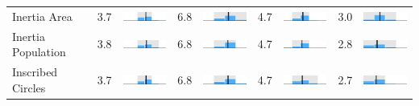 \begin{table}
\begin{tabular}{l rm{7em} rm{7em} rm{7em} rm{7em}}
Inertia Area           &   3.7 &    \includegraphics[width=7em]{mini_hist/WI_2004_inertia_a} &   6.8 &    \includegraphics[width=7em]{mini_hist/WI_2008_inertia_a} &   4.7 &    \includegraphics[width=7em]{mini_hist/WI_2012_inertia_a} &   3.0 &    \includegraphics[width=7em]{mini_hist/WI_2016_inertia_a} \\
Inertia Population     &   3.8 &    \includegraphics[width=7em]{mini_hist/WI_2004_inertia_p} &   6.8 &    \includegraphics[width=7em]{mini_hist/WI_2008_inertia_p} &   4.7 &    \includegraphics[width=7em]{mini_hist/WI_2012_inertia_p} &   2.8 &    \includegraphics[width=7em]{mini_hist/WI_2016_inertia_p} \\
Inscribed Circles      &   3.7 &    \includegraphics[width=7em]{mini_hist/WI_2004_ehrenburg} &   6.8 &    \includegraphics[width=7em]{mini_hist/WI_2008_ehrenburg} &   4.7 &    \includegraphics[width=7em]{mini_hist/WI_2012_ehrenburg} &   2.7 &    \includegraphics[width=7em]{mini_hist/WI_2016_ehrenburg} \\

\end{tabular}
\end{table}

